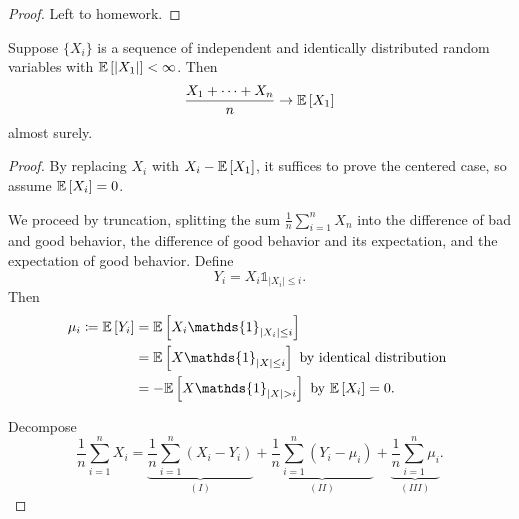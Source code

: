 \begin{proof}
	Left to homework.
\end{proof}

\begin{theorem}
	Suppose $\{X_i\}$ is a sequence of independent and identically distributed random variables with $\mathbb{E}\left[\left| X_1 \right|\right] < \infty$. Then
	\[
		\frac{X_1 + \cdots + X_n}{n}\to \mathbb{E}\left[X_1\right]
	\]
	almost surely.
\end{theorem}

\begin{proof}
	By replacing $X_i$ with $X_i - \mathbb{E}\left[X_1\right]$, it suffices to prove the centered case, so assume $\mathbb{E}\left[X_i\right] = 0$.

	We proceed by truncation, splitting the sum $\frac{1}{n} \sum_{i=1}^{n} X_n$ into the difference of bad and good behavior, the difference of good behavior and its expectation, and the expectation of good behavior. Define \[
		Y_i = X_i \mathds{1}_{\left| X_i \right| \le i}
	.\] Then
	\begin{align*}
		\mu_i \coloneqq \E\left[Y_i\right] &= \E\left[X_i \mathds{1}_{\left| X_i \right| \le i}\right]  \\
								   &= \E\left[X \mathds{1}_{\left| X \right| \le i}\right] \text{ by identical distribution } \\
								   &= - \E\left[X \mathds{1}_{\left| X \right| > i}\right] \text{ by $\E\left[X_i\right] =0$}
	.\end{align*}

	Decompose \[
		\frac{1}{n} \sum\limits_{i=1}^{n} X_i = \underbrace{\frac{1}{n} \sum\limits_{i=1}^{n} \left( X_i - Y_i \right)}_{(I)} + \underbrace{\frac{1}{n} \sum\limits_{i=1}^{n} \left( Y_i - \mu_i \right)}_{(II)} + \underbrace{\frac{1}{n}\sum\limits_{i=1}^{n} \mu_i}_{(III)}
	.\] 
	

\end{proof}
